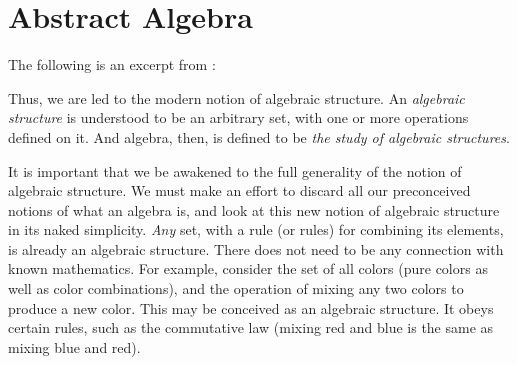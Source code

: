 \part{Abstract Algebra}\label{part:abstract-algebra}
The following is an excerpt from \cite{pinter}:

Thus, we are led to the modern notion of algebraic structure. An \emph{algebraic structure} is understood to be an arbitrary set, with one or more operations defined on it. And algebra, then, is defined to be \emph{the study of algebraic structures}.

It is important that we be awakened to the full generality of the notion of algebraic structure. We must make an effort to discard all our preconceived notions of what an algebra is, and look at this new notion of algebraic structure in its naked simplicity. \emph{Any} set, with a rule (or rules) for combining its elements, is already an algebraic structure. There does not need to be any connection with known mathematics. For example, consider the set of all colors (pure colors as well as color combinations), and the operation of mixing any two colors to produce a new color. This may be conceived as an algebraic structure. It obeys certain rules, such as the commutative law (mixing red and blue is the same as mixing blue and red).